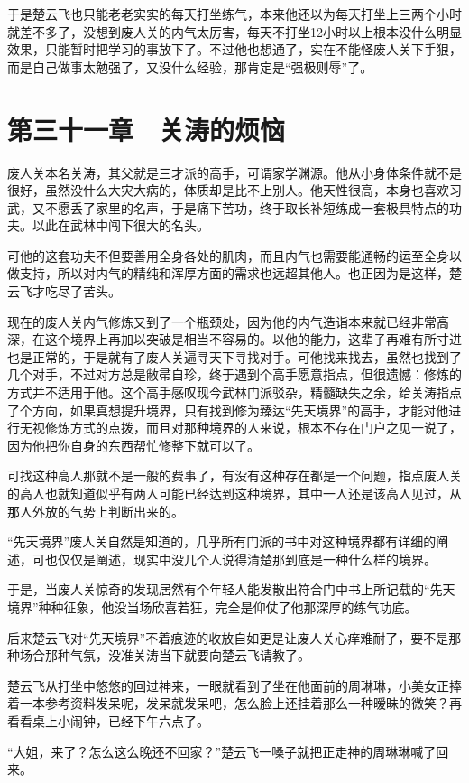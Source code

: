 于是楚云飞也只能老老实实的每天打坐练气，本来他还以为每天打坐上三两个小时就差不多了，没想到废人关的内气太厉害，每天不打坐12小时以上根本没什么明显效果，只能暂时把学习的事放下了。不过他也想通了，实在不能怪废人关下手狠，而是自己做事太勉强了，又没什么经验，那肯定是“强极则辱”了。

\section{第三十一章　关涛的烦恼}

废人关本名关涛，其父就是三才派的高手，可谓家学渊源。他从小身体条件就不是很好，虽然没什么大灾大病的，体质却是比不上别人。他天性很高，本身也喜欢习武，又不愿丢了家里的名声，于是痛下苦功，终于取长补短练成一套极具特点的功夫。以此在武林中闯下很大的名头。

可他的这套功夫不但要善用全身各处的肌肉，而且内气也需要能通畅的运至全身以做支持，所以对内气的精纯和浑厚方面的需求也远超其他人。也正因为是这样，楚云飞才吃尽了苦头。

现在的废人关内气修炼又到了一个瓶颈处，因为他的内气造诣本来就已经非常高深，在这个境界上再加以突破是相当不容易的。以他的能力，这辈子再难有所寸进也是正常的，于是就有了废人关遍寻天下寻找对手。可他找来找去，虽然也找到了几个对手，不过对方总是敝帚自珍，终于遇到个高手愿意指点，但很遗憾：修炼的方式并不适用于他。这个高手感叹现今武林门派驳杂，精髓缺失之余，给关涛指点了个方向，如果真想提升境界，只有找到修为臻达“先天境界”的高手，才能对他进行无视修炼方式的点拨，而且对那种境界的人来说，根本不存在门户之见一说了，因为他把你自身的东西帮忙修整下就可以了。

可找这种高人那就不是一般的费事了，有没有这种存在都是一个问题，指点废人关的高人也就知道似乎有两人可能已经达到这种境界，其中一人还是该高人见过，从那人外放的气势上判断出来的。

“先天境界”废人关自然是知道的，几乎所有门派的书中对这种境界都有详细的阐述，可也仅仅是阐述，现实中没几个人说得清楚那到底是一种什么样的境界。

于是，当废人关惊奇的发现居然有个年轻人能发散出符合门中书上所记载的“先天境界”种种征象，他没当场欣喜若狂，完全是仰仗了他那深厚的练气功底。

后来楚云飞对“先天境界”不着痕迹的收放自如更是让废人关心痒难耐了，要不是那种场合那种气氛，没准关涛当下就要向楚云飞请教了。

楚云飞从打坐中悠悠的回过神来，一眼就看到了坐在他面前的周琳琳，小美女正捧着一本参考资料发呆呢，发呆就发呆吧，怎么脸上还挂着那么一种暧昧的微笑？再看看桌上小闹钟，已经下午六点了。

“大姐，来了？怎么这么晚还不回家？”楚云飞一嗓子就把正走神的周琳琳喊了回来。

